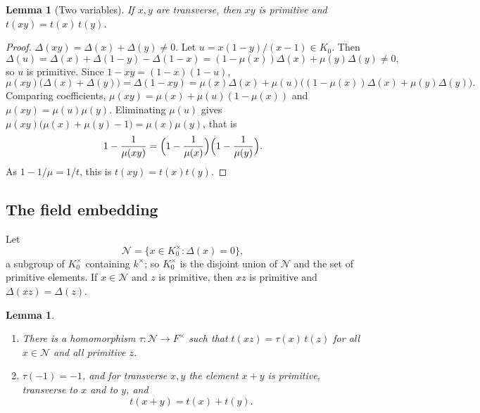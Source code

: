 \documentclass[11pt]{amsart}
\newtheorem{lemma}[theorem]{Lemma}
\theoremstyle{definition}
\theoremstyle{remark}
\begin{document}
\begin{lemma}[Two variables]\label{lem:twovar}
If $x,y$ are transverse, then $xy$ is primitive and $t(xy)=t(x)\,t(y)$.
\end{lemma}

\begin{proof}
$\Delta(xy)=\Delta(x)+\Delta(y)\ne0$. Let $u=x(1-y)/(x-1)\in K_0$. Then
\[ \Delta(u)=\Delta(x)+\Delta(1-y)-\Delta(1-x)=(1-\mu(x))\Delta(x)+\mu(y)\Delta(y)\neq0, \]
so $u$ is primitive. Since $1-xy=(1-x)(1-u)$,
\[ \mu(xy)\bigl(\Delta(x)+\Delta(y)\bigr)=\Delta(1-xy)=\mu(x)\Delta(x)+\mu(u)\bigl((1-\mu(x))\Delta(x)+\mu(y)\Delta(y)\bigr). \]
Comparing coefficients, $\mu(xy)=\mu(x)+\mu(u)(1-\mu(x))$ and $\mu(xy)=\mu(u)\mu(y)$. Eliminating $\mu(u)$ gives $\mu(xy)\bigl(\mu(x)+\mu(y)-1\bigr)=\mu(x)\mu(y)$, that is
\[ 1-\frac1{\mu(xy)}=\Bigl(1-\frac1{\mu(x)}\Bigr)\Bigl(1-\frac1{\mu(y)}\Bigr). \]
As $1-1/\mu=1/t$, this is $t(xy)=t(x)t(y)$.
\end{proof}

\subsection{The field embedding}

Let
\[ \mathcal N=\{x\in K_0^\times:\Delta(x)=0\}, \]
a subgroup of $K_0^\times$ containing $k^\times$; so $K_0^\times$ is the disjoint union of $\mathcal N$ and the set of primitive elements. If $x\in\mathcal N$ and $z$ is primitive, then $xz$ is primitive and $\Delta(xz)=\Delta(z)$.

\begin{lemma}\label{lem:tconst}
\begin{enumerate}[label=\textup{(\alph*)}]
\item There is a homomorphism $\tau\colon\mathcal N\to F^\times$ such that $t(xz)=\tau(x)\,t(z)$ for all $x\in\mathcal N$ and all primitive $z$.
\item $\tau(-1)=-1$, and for transverse $x,y$ the element $x+y$ is primitive, transverse to $x$ and to $y$, and
\[ t(x+y)=t(x)+t(y). \]
\end{enumerate}
\end{lemma}
\end{document}
